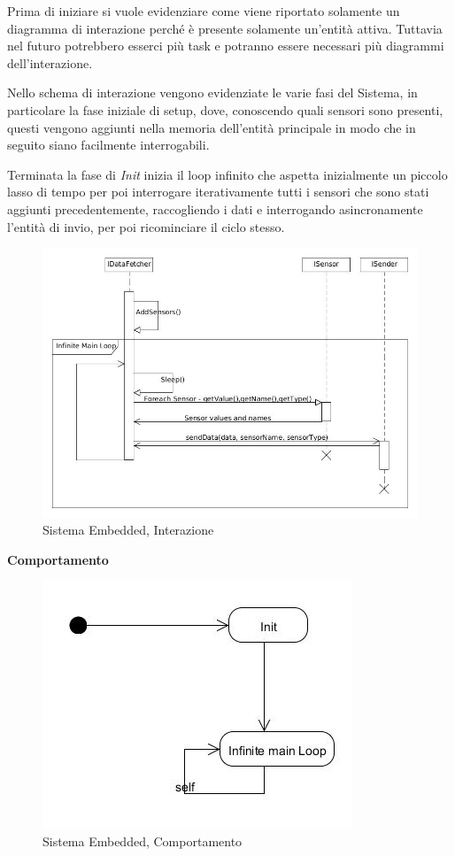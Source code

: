 Prima di iniziare si vuole evidenziare come viene riportato solamente un diagramma di interazione perch\'e \`e presente solamente un'entit\`a attiva. Tuttavia nel futuro potrebbero esserci pi\`u task e potranno essere necessari pi\`u diagrammi dell'interazione.

Nello schema di interazione vengono evidenziate le varie fasi del Sistema, in particolare la fase iniziale di setup, dove, conoscendo quali sensori sono presenti, questi vengono aggiunti nella memoria dell'entit\`a principale in modo che in seguito siano facilmente interrogabili.

Terminata la fase di \textit{Init} inizia il loop infinito che aspetta inizialmente un piccolo lasso di tempo per poi interrogare iterativamente tutti i sensori che sono stati aggiunti precedentemente, raccogliendo i dati e interrogando asincronamente l'entit\`a di invio, per poi ricominciare il ciclo stesso.

\begin{figure}[h]
\centering
\includegraphics[scale=0.4]{Figures/DomainModel/EmbeddedSystem/Interaction}
\caption{Sistema Embedded, Interazione}
\end{figure}

\newpage

\begin{center}
\textbf{Comportamento}
\end{center}

\begin{figure}[h]
\centering
\includegraphics[scale=0.5]{Figures/DomainModel/EmbeddedSystem/Behaviour}
\caption{Sistema Embedded, Comportamento}
\end{figure}


